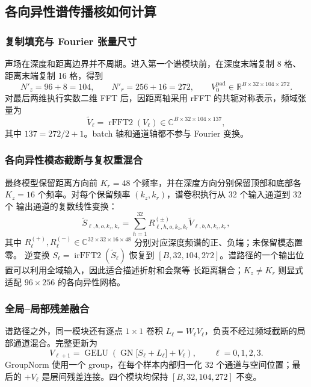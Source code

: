 \documentclass[UTF8,11pt]{ctexart}
\begin{document}
\subsection{各向异性谱传播核如何计算}

\subsubsection{复制填充与 Fourier 张量尺寸}

声场在深度和距离边界并不周期。进入第一个谱模块前，在深度末端复制 8 格、距离末端复制
16 格，得到
\begin{equation}
  N'_z=96+8=104,\qquad N'_r=256+16=272,\qquad
  V_0^{\mathrm{pad}}\in\mathbb{R}^{B\times32\times104\times272}.
\end{equation}
对最后两维执行实数二维 FFT 后，因距离轴采用 rFFT 的共轭对称表示，频域张量为
\begin{equation}
  \widetilde V_\ell=\operatorname{rFFT2}(V_\ell)
  \in\mathbb{C}^{B\times32\times104\times137},
\end{equation}
其中 $137=272/2+1$。batch 轴和通道轴都不参与 Fourier 变换。

\subsubsection{各向异性模态截断与复权重混合}

最终模型保留距离方向前 $K_r=48$ 个频率，并在深度方向分别保留顶部和底部各
$K_z=16$ 个频率。对每个保留频率 $(k_z,k_r)$，谱卷积执行从 32 个输入通道到 32 个
输出通道的复数线性变换：
\begin{equation}
  \widetilde S_{\ell,b,o,k_z,k_r}
  =\sum_{h=1}^{32}R^{(\pm)}_{\ell,h,o,k_z,k_r}
  \widetilde V_{\ell,b,h,k_z,k_r},
\end{equation}
其中 $R^{(+)}_\ell,R^{(-)}_\ell\in
\mathbb{C}^{32\times32\times16\times48}$ 分别对应深度频谱的正、负端；未保留模态置零。
逆变换
$S_\ell=\operatorname{irFFT2}(\widetilde S_\ell)$ 恢复到
$[B,32,104,272]$。谱路径的一个输出位置可以利用全域输入，因此适合描述折射和会聚等
长距离耦合；$K_z\ne K_r$ 则显式适配 $96\times256$ 的各向异性网格。

\subsubsection{全局--局部残差融合}

谱路径之外，同一模块还有逐点 $1\times1$ 卷积
$L_\ell=W_\ell V_\ell$，负责不经过频域截断的局部通道混合。完整更新为
\begin{equation}
  V_{\ell+1}=\operatorname{GELU}\!\left(
  \operatorname{GN}\big[S_\ell+L_\ell\big]+V_\ell\right),
  \qquad \ell=0,1,2,3.
\end{equation}
GroupNorm 使用一个 group，在每个样本内部归一化 32 个通道与空间位置；最后的
$+V_\ell$ 是层间残差连接。四个模块均保持 $[B,32,104,272]$ 不变。
\end{document}
